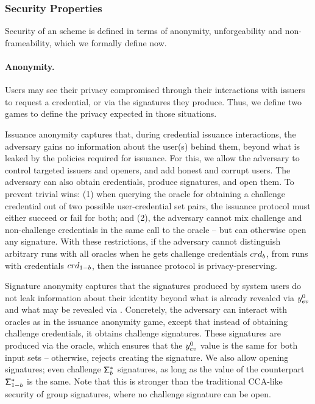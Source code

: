 \subsubsection{Security Properties}
\label{sssec:security}
%
Security of an \UAS scheme is defined in terms of anonymity, unforgeability and
non-frameability, which we formally define now.

\paragraph{Anonymity.} %
Users may see their privacy compromised through their interactions with issuers
to request a credential, or via the signatures they produce. Thus, we define two
games to define the privacy expected in those situations.

Issuance anonymity captures that, during credential issuance
interactions, the adversary gains no information about the user(s) behind them,
beyond what is leaked by the policies required for issuance. For this, we allow
the adversary to control targeted issuers and openers, and add honest and
corrupt users. The adversary can also obtain credentials, produce signatures,
and open them. To prevent trivial wins: (1) when querying the oracle for
obtaining a challenge credential out of two possible user-credential set pairs,
the issuance protocol must either succeed or fail for both; and (2), the
adversary cannot mix challenge and non-challenge credentials in the same call to
the \SIGN oracle -- but can otherwise open any signature. With these
restrictions, if the adversary cannot distinguish arbitrary runs with all
oracles when he gets challenge credentials $crd_b$, from runs with credentials
$crd_{1-b}$, then the issuance protocol is privacy-preserving.

Signature anonymity captures that the signatures produced by system users do not
leak information about their identity beyond what is already revealed via
$y_{ev}^0$ and what may be revealed via \yinsp. Concretely, the adversary can
interact with oracles as in the issuance anonymity game, except that instead of
obtaining challenge credentials, it obtains challenge signatures. These
signatures are produced via the \CHALb oracle, which ensures that the $y_{ev}^0$
value is the same for both input sets -- otherwise, rejects creating the
signature. We also allow opening signatures; even challenge $\mathsf{\Sigma}^*_b$
signatures, as long as the \yinsp value of the counterpart $\mathsf{\Sigma}^*_{1-b}$ is the
same. Note that this is stronger than the traditional CCA-like security of group
signatures, where no challenge signature can be open.

